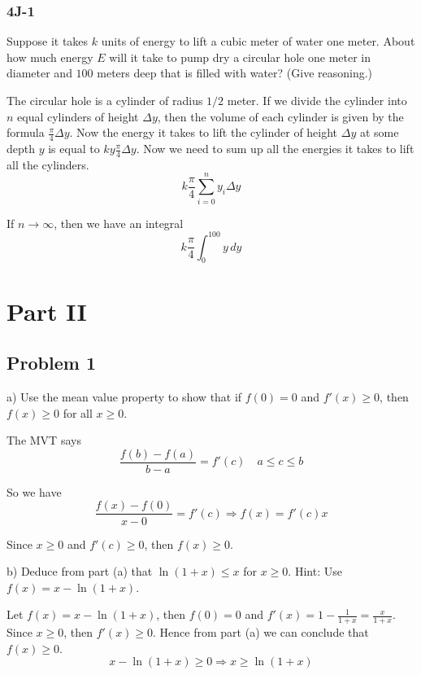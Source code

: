 \documentclass{article}
\begin{document}
\subsubsection{4J-1}
\begin{tcolorbox}
    Suppose it takes $k$ units of energy to lift a cubic meter of water one meter. About how much energy $E$ will it take to pump dry a circular hole one meter in diameter and $100$ meters deep that is filled with water? (Give reasoning.) 
\end{tcolorbox}
The circular hole is a cylinder of radius $1/2$ meter. If we divide the cylinder into $n$ equal cylinders of height $\Delta y$, then the volume of each cylinder is given by the formula $\frac{\pi}{4}\Delta y$. Now the energy it takes to lift the cylinder of height $\Delta y$ at some depth $y$ is equal to $ky\frac{\pi}{4}\Delta y$. Now we need to sum up all the energies it takes to lift all the cylinders.
\[ k\frac{\pi}{4} \sum \limits_{i = 0}^n y_i \Delta y \]
\par If $n \to \infty$, then we have an integral
\[ k\frac{\pi}{4} \int_{0}^{100} {y \, dy} \]
\section{Part II}

\subsection{Problem 1}
\begin{tcolorbox}
    a) Use the mean value property to show that if $f(0) = 0$ and $f'(x) \geq 0$, then $f(x) \geq 0$ for all $x \geq 0$.
\end{tcolorbox}
The MVT says
\[ \frac{f(b) - f(a)}{b - a} = f'(c) \quad a \le c \le b \]

\par So we have
\[ \frac{f(x) - f(0)}{x - 0} = f'(c) \Rightarrow f(x) = f'(c)x \]

Since $x \geq 0$ and $f'(c) \geq 0$, then $f(x) \geq 0$.

\begin{tcolorbox}
    b) Deduce from part (a) that $\ln{(1 + x)} \leq x$ for $x \geq 0$. Hint: Use $f(x) = x - \ln{(1 + x)}$.
\end{tcolorbox}

Let $f(x) = x - \ln{(1+x)}$, then $f(0) = 0$ and $f'(x) = 1 - \frac{1}{1+x} = \frac{x}{1+x}$. Since $x \geq 0$, then $f'(x) \geq 0$. Hence from part (a) we can conclude that $f(x) \geq 0$.
\[ x - \ln{(1+x)} \geq 0 \Rightarrow x \geq \ln{(1+x)} \]
\end{document}

